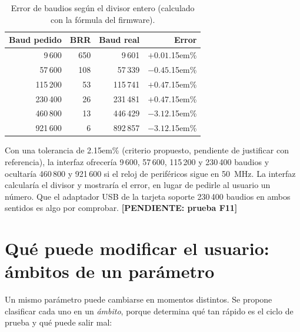 \documentclass[12pt,letterpaper]{article}
\newcommand{\pendiente}[1]{\textbf{[PENDIENTE: #1]}}
\begin{document}
\begin{table}[!htbp]
\centering
\caption{Error de baudios según el divisor entero (calculado con la fórmula del firmware).}
\label{tab:baud}
\begin{tabular}{rrrr}
\toprule
\textbf{Baud pedido} & \textbf{BRR} & \textbf{Baud real} & \textbf{Error} \\
\midrule
9\,600 & 650 & 9\,601 & $+0.01$\kern.15em\relax\% \\
57\,600 & 108 & 57\,339 & $-0.45$\kern.15em\relax\% \\
115\,200 & 53 & 115\,741 & $+0.47$\kern.15em\relax\% \\
230\,400 & 26 & 231\,481 & $+0.47$\kern.15em\relax\% \\
460\,800 & 13 & 446\,429 & $-3.12$\kern.15em\relax\% \\
921\,600 & 6 & 892\,857 & $-3.12$\kern.15em\relax\% \\
\bottomrule
\end{tabular}
\end{table}

Con una tolerancia de 2\kern.15em\relax\% (criterio propuesto, pendiente de justificar con referencia), la interfaz ofrecería 9\,600, 57\,600, 115\,200 y 230\,400 baudios y ocultaría 460\,800 y 921\,600 si el reloj de periféricos sigue en 50~MHz. La interfaz calcularía el divisor y mostraría el error, en lugar de pedirle al usuario un número. Que el adaptador USB de la tarjeta soporte 230\,400 baudios en ambos sentidos es algo por comprobar. \pendiente{prueba F11}

\section{Qué puede modificar el usuario: ámbitos de un parámetro}
\label{sec:ambitos}

Un mismo parámetro puede cambiarse en momentos distintos. Se propone clasificar cada uno en un \emph{ámbito}, porque determina qué tan rápido es el ciclo de prueba y qué puede salir mal:
\end{document}
